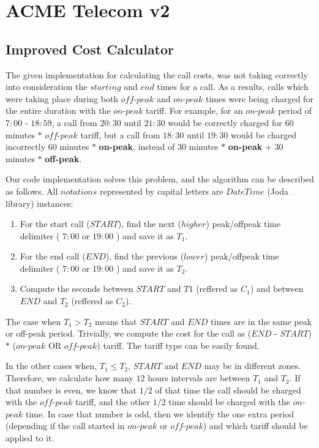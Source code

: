 \documentclass[11pt,twocolumn]{article} %
\begin{document}
\section{ACME Telecom v2}

\subsection{Improved Cost Calculator}

The given implementation for calculating the call costs, was not taking correctly into consideration 
the $starting$ and $end$ times for a call. As a results, calls which were taking place during both $off$-$peak$ and 
$on$-$peak$ times were being charged for the entire duration with the $on$-$peak$ tariff. For example, for an $on$-$peak$
period of $7:00$ - $18:59$, a call from $20:30$ until $21:30$ would be correctly charged for $60$ minutes $\ast$
$off$-$peak$ tariff, but a call from  $18:30$ until $19:30$ would be charged incorrectly $60$ minutes $\ast$ \textbf{on-peak},
instead of $30$ minutes $\ast$ \textbf{on-peak} $+$ 30 minutes $\ast$ \textbf{off-peak}.

Our code implementation solves this problem, and the algorithm can be described as follows. All $notations$ represented by capital letters 
are $DateTime$ (Joda library) instances:
\begin{enumerate}
\item{For the start call ($START$), find the next ($higher$) peak/offpeak time delimiter ( $7:00$ or $19:00$ ) and save it as $T_1$.}

\item{For the end call ($END$), find the previous ($lower$) peak/offpeak time delimiter ( $7:00$ or $19:00$ ) and save it as $T_2$.}

\item{Compute the seconds between $START$ and $T1$ (reffered as $C_1$) and between $END$ and $T_2$ (reffered as $C_2$).}


\end{enumerate}

The case when $T_1 > T_2$ means that $START$ and $END$ times are in the same peak or off-peak period. Trivially, we compute the 
cost for the call as ($END$ - $START$) $\ast$ ($on$-$peak$ OR $off$-$peak$) tariff. The tariff type can be easily found. 

In the other cases when, $T_1 \leq T_2$, $START$ and $END$ may be in different zones. Therefore, we calculate how many $12$ hours intervals are between $T_1$ and $T_2$.
If that number is even,  we know that $1/2$ of that time the call should be 
charged with the $off$-$peak$ tariff, and the other $1/2$ time should be charged with the $on$-$peak$ time. 
In case that number is odd, then we identify the one extra period (depending if the call started in $on$-$peak$ or $off$-$peak$) and which tariff should be applied to it.
\end{document}
